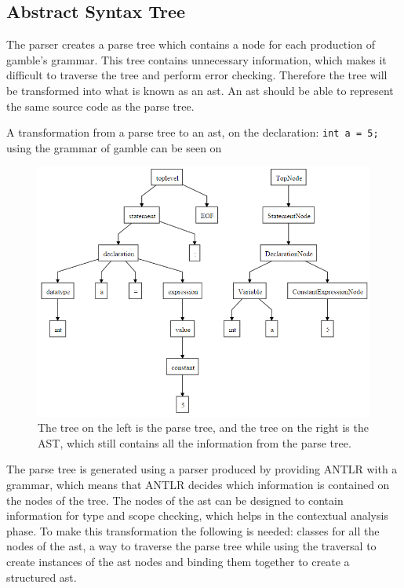 \subsection*{Abstract Syntax Tree}\label{sec:AST}
The parser creates a parse tree which contains a node for each production of \gls{gamble}'s grammar.
This tree contains unnecessary information, which makes it difficult to traverse the tree and perform error checking.
Therefore the tree will be transformed into what is known as an \acrfull{ast}.
An \acrshort{ast} should be able to represent the same source code as the parse tree.



A transformation from a parse tree to an \acrshort{ast}, on the declaration: \texttt{int a = 5;} using the grammar of \gls{gamble} can be seen on 

\begin{figure}
		\centering
	 	\includegraphics[width=0.8\linewidth]{figures/Trees/AST.PNG}
		\caption{The tree on the left is the parse tree, and the tree on the right is the AST, which still contains all the information from the parse tree.}\label{image:AST}
\end{figure}

The parse tree is generated using a parser produced by providing ANTLR with a grammar, which means that ANTLR decides which information is contained on the nodes of the tree.
The nodes of the \acrshort{ast} can be designed to contain information for type and scope checking, which helps in the contextual analysis phase.
To make this transformation the following is needed: classes for all the nodes of the \acrshort{ast}, a way to traverse the parse tree while using the traversal to create instances of the \acrshort{ast} nodes and binding them together to create a structured \acrshort{ast}.



